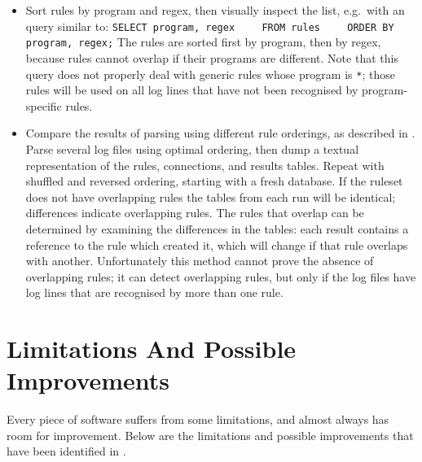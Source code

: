 \begin{itemize}

    \item Sort rules by program and regex, then visually inspect the list,
        e.g.\ with an  query similar to:   \newline{}
        \verb!SELECT program, regex!                    \newline{}
        \verb!    FROM rules!                           \newline{}
        \verb!    ORDER BY program, regex;!             \newline{}
        The rules are sorted first by program, then by regex, because rules
        cannot overlap if their programs are different.  Note that this
        query does not properly deal with generic rules whose program is
        \texttt{*}; those rules will be used on all log lines that have not
        been recognised by program-specific rules.

    \item Compare the results of parsing using different rule orderings, as
        described in .  Parse
        several log files using optimal ordering, then dump a textual
        representation of the rules, connections, and results tables.
        Repeat with shuffled and reversed ordering, starting with a fresh
        database.  If the ruleset does not have overlapping rules the
        tables from each run will be identical; differences indicate
        overlapping rules.  The rules that overlap can be determined by
        examining the differences in the tables: each result contains a
        reference to the rule which created it, which will change if that
        rule overlaps with another.  Unfortunately this method cannot prove
        the absence of overlapping rules; it can detect overlapping rules,
        but only if the log files have log lines that are recognised by
        more than one rule.

\end{itemize}



\section{Limitations And Possible Improvements}

\label{limitations and improvements in implementation}

Every piece of software suffers from some limitations, and almost always
has room for improvement.  Below are the limitations and possible
improvements that have been identified in \parsername{}.

